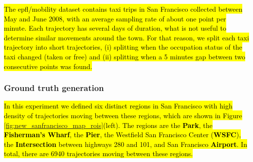 \documentclass[12pt]{article}
\begin{document}
\hl{The epfl/mobility dataset contains taxi trips in San Francisco collected between May and June 2008, with an average sampling rate of about one point per minute. Each trajectory has several days of duration, what is not useful to determine similar movements around the town. For that reason, we split each taxi trajectory into short trajectories, (i) splitting when the occupation status of the taxi changed (taken or free) and (ii) splitting when a 5 minutes gap between two consecutive points was found.}

\subsubsection{Ground truth generation}
\hl{In this experiment we defined six distinct regions in San Francisco with high density of trajectories moving between these regions, which are shown in Figure {\ref{fig:new_sanfrancisco_map_rois}}(left). The regions are the \textbf{Park}, the \textbf{Fisherman's Wharf}, the \textbf{Pier}, the Westfield San Francisco Center (\textbf{WSFC}), the \textbf{Intersection} between highways 280 and 101, and San Francisco \textbf{Airport}. In total, there are 6940 trajectories moving between these regions.}

\end{document}
